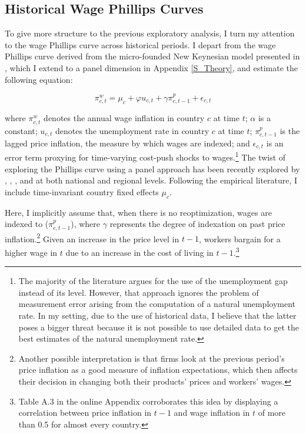 \documentclass[12pt]{article}
\begin{document}
\subsection{Historical Wage Phillips Curves}

To give more structure to the previous exploratory analysis, I turn my attention to the wage Phillips curve across historical periods. I depart from the wage Phillips curve derived from the micro-founded New Keynesian model presented in \cite{Gali2011}, which I extend to a panel dimension in Appendix \ref{S_Theory}, and estimate the following equation:

\begin{equation} \label{EQ:Baseline}
    \pi_{c,t}^w = \mu_c + \varphi u_{c,t} + \gamma \pi_{c,t-1}^p + \epsilon_{c,t}
\end{equation}

where $\pi_{c,t}^w$ denotes the annual wage inflation in country $c$ at time $t$; $\alpha$ is a constant; $u_{c,t}$ denotes the unemployment rate in country $c$ at time $t$; $\pi_{c,t-1}^p$ is the lagged price inflation, the measure by which wages are indexed; and $\epsilon_{c,t}$ is an error term proxying for time-varying cost-push shocks to wages.\footnote{The majority of the literature argues for the use of the unemployment gap instead of its level. However, that approach ignores the problem of measurement error arising from the computation of a natural unemployment rate. In my setting, due to the use of historical data, I believe that the latter poses a bigger threat because it is not possible to use detailed data to get the best estimates of the natural unemployment rate.} The twist of exploring the Phillips curve using a panel approach has been recently explored by \cite{Coibion2019}, \cite{Levy2019}, \cite{DeSchryder2020}, and \cite{Hazell2021} at both national and regional levels. Following the empirical literature, I include time-invariant country fixed effects $\mu_c$. %

Here, I implicitly assume that, when there is no reoptimization, wages are indexed to ($\pi_{c,t-1}^p$), where $\gamma$ represents the degree of indexation on past price inflation.\footnote{Another possible interpretation is that firms look at the previous period's price inflation as a good measure of inflation expectations, which then affects their decision in changing both their products' prices and workers' wages.} Given an increase in the price level in $t-1$, workers bargain for a higher wage in $t$ due to an increase in the cost of living in $t-1$.\footnote{Table A.3 in the online Appendix corroborates this idea by displaying a correlation between price inflation in $t-1$ and wage inflation in $t$ of more than 0.5 for almost every country.}
\end{document}
